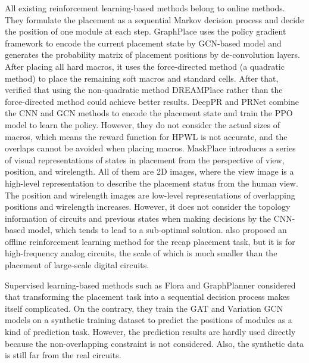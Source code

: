 \documentclass{article}
\theoremstyle{plain}
\theoremstyle{definition}
\theoremstyle{remark}
\begin{document}
All existing reinforcement learning-based methods belong to online methods. They formulate the placement as a sequential Markov decision process and decide the position of one module at each step. GraphPlace \cite{mirhoseini2021graph} uses the policy gradient framework \cite{sutton1999policy} to encode the current placement state by GCN-based model and generates the probability matrix of placement positions by de-convolution layers. After placing all hard macros, it uses the force-directed method (a quadratic method) \cite{spindler2008kraftwerk2} to place the remaining soft macros and standard cells. After that, \citet{jiang2021delving} verified that using the non-quadratic method DREAMPlace rather than the force-directed method could achieve better results. DeepPR \cite{cheng2021joint} and PRNet \cite{chengpolicy} combine the CNN and GCN methods to encode the placement state and train the PPO model \cite{schulman2017proximal} to learn the policy. However, they do not consider the actual sizes of macros, which means the reward function for HPWL is not accurate, and the overlaps cannot be avoided when placing macros. MaskPlace \cite{lai2022maskplace} introduces a series of visual representations of states in placement from the perspective of view, position, and wirelength. All of them are 2D images, where the view image is a high-level representation to describe the placement status from the human view. The position and wirelength images are low-level representations of overlapping positions and wirelength increases. 
However, it does not consider the topology information of circuits and previous states when making decisions by the CNN-based model, which tends to lead to a sub-optimal solution.
\citet{kimcollaborative} also proposed an offline reinforcement learning method for the recap placement task, but it is for high-frequency analog circuits, the scale of which is much smaller than the placement of large-scale digital circuits.

Supervised learning-based methods such as Flora \cite{liu2022floorplanning} and GraphPlanner \cite{liu2022graphplanner} considered that transforming the placement task into a sequential decision process makes itself complicated. On the contrary, they train the GAT \cite{velivckovic2017graph} and Variation GCN \cite{kipf2016semi} models on a synthetic training dataset to predict the positions of modules as a kind of prediction task. However, the prediction results are hardly used directly because the non-overlapping constraint is not considered. Also, the synthetic data is still far from the real circuits.
\end{document}
